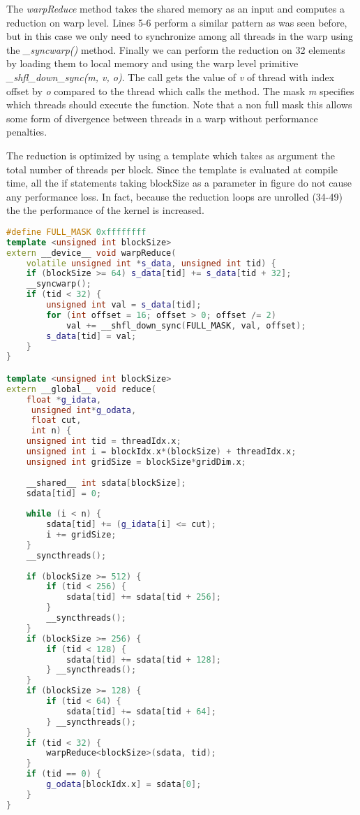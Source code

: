 \documentclass[]{article}
\begin{document}
The \textit{warpReduce} method takes the shared memory as an input and computes a reduction on warp level. Lines 5-6 perform a similar pattern as was seen before, but in this case we only need to synchronize among all threads in the warp using the \textit{\_syncwarp()} method. Finally we can perform the reduction on 32 elements by loading them to local memory and using the warp level primitive \textit{\_shfl\_down\_sync(m, v, o)}. The call gets the value of \textit{v} of thread with index offset by \textit{o} compared to the thread which calls the method. The mask \textit{m} specifies which threads should execute the function. Note that a non full mask this allows some form of divergence between threads in a warp without performance penalties. \cite{warps}

The reduction is optimized by using a template which takes as argument the total number of threads per block. Since the template is evaluated at compile time, all the if statements taking blockSize as a parameter in figure do not cause any performance loss. In fact, because  the reduction loops are unrolled (34-49) the the performance of the kernel is increased. \cite{reduction}

\begin{lstlisting}[language=c++, caption=Conditional Reduction in CUDA, label=cuda:reduction]
#define FULL_MASK 0xffffffff
template <unsigned int blockSize>
extern __device__ void warpReduce(
	volatile unsigned int *s_data, unsigned int tid) {
    if (blockSize >= 64) s_data[tid] += s_data[tid + 32];
	__syncwarp();
	if (tid < 32) {
		unsigned int val = s_data[tid];
		for (int offset = 16; offset > 0; offset /= 2)
			val += __shfl_down_sync(FULL_MASK, val, offset);
		s_data[tid] = val;
	}
}

template <unsigned int blockSize>
extern __global__ void reduce(
	float *g_idata,
	 unsigned int*g_odata, 
	 float cut, 
	 int n) {
	unsigned int tid = threadIdx.x;
	unsigned int i = blockIdx.x*(blockSize) + threadIdx.x;
	unsigned int gridSize = blockSize*gridDim.x;
	
	__shared__ int sdata[blockSize];
	sdata[tid] = 0;
	
	while (i < n) {
		sdata[tid] += (g_idata[i] <= cut);
		i += gridSize;
	}
	__syncthreads();
	
	if (blockSize >= 512) {
		if (tid < 256) {
			sdata[tid] += sdata[tid + 256];
		}
		__syncthreads();
	}
	if (blockSize >= 256) {
		if (tid < 128) {
			sdata[tid] += sdata[tid + 128];
		} __syncthreads();
	}
	if (blockSize >= 128) {
		if (tid < 64) {
			sdata[tid] += sdata[tid + 64];
		} __syncthreads();
	}
	if (tid < 32) {
		warpReduce<blockSize>(sdata, tid);
	}
	if (tid == 0) {
		g_odata[blockIdx.x] = sdata[0];
	}
}
\end{lstlisting}
\end{document}
